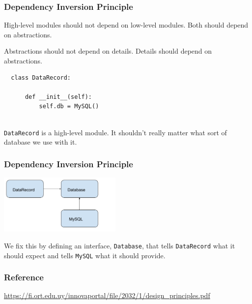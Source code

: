 \documentclass[10pt]{beamer}
\begin{document}
\begin{frame}[fragile]
  \frametitle{Dependency Inversion Principle}
  
    High-level modules should not depend on low-level modules. Both should depend on abstractions.
    
    Abstractions should not depend on details. Details should depend on abstractions.
  
  \begin{verbatim}
  class DataRecord:
  
      def __init__(self):
          self.db = MySQL()
  
  \end{verbatim}
  
  \texttt{DataRecord} is a high-level module. It shouldn't really matter what sort of database we use with it.
  \end{frame} 
\begin{frame}[fragile]
  \frametitle{Dependency Inversion Principle}

   \includegraphics[width=6cm]{dip.png}
   
   We fix this by defining an interface, \texttt{Database}, that tells \texttt{DataRecord} what it should expect and
   tells \texttt{MySQL} what it should provide.
\end{frame} 

\begin{frame}
  \frametitle{Reference}
  
  \url{https://fi.ort.edu.uy/innovaportal/file/2032/1/design_principles.pdf}
  
\end{frame}

  
\end{document}
